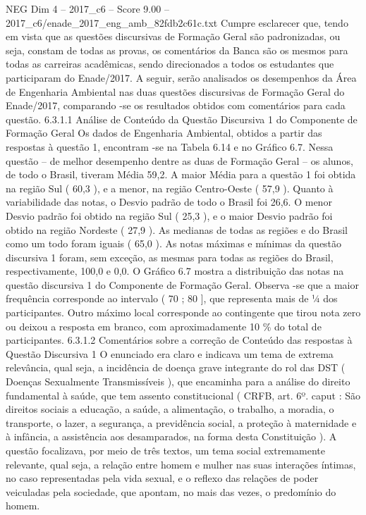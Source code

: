 \begin{textsample}{NEG Dim 4 – 2017\_c6 – Score 9.00 – 2017\_c6/enade\_2017\_eng\_amb\_82fdb2c61c.txt}
Cumpre esclarecer que, tendo em vista que as questões discursivas de Formação Geral são padronizadas, ou seja, constam de todas as provas, os comentários da Banca são os mesmos para todas as carreiras acadêmicas, sendo direcionados a todos os estudantes que participaram do Enade/2017.
A seguir, serão analisados os desempenhos da Área de Engenharia Ambiental nas duas questões discursivas de Formação Geral do Enade/2017, comparando -se os resultados obtidos com comentários para cada questão. 6.3.1.1 Análise de Conteúdo da Questão Discursiva 1 do Componente de Formação Geral Os dados de Engenharia Ambiental, obtidos a partir das respostas à questão 1, encontram -se na Tabela 6.14 e no Gráfico 6.7.
Nessa questão – de melhor desempenho dentre as duas de Formação Geral – os alunos, de todo o Brasil, tiveram Média 59,2.
A maior Média para a questão 1 foi obtida na região Sul ( 60,3 ), e a menor, na região Centro-Oeste ( 57,9 ).
Quanto à variabilidade das notas, o Desvio padrão de todo o Brasil foi 26,6.
O menor Desvio padrão foi obtido na região Sul ( 25,3 ), e o maior Desvio padrão foi obtido na região Nordeste ( 27,9 ).
As medianas de todas as regiões e do Brasil como um todo foram iguais ( 65,0 ).
As notas máximas e mínimas da questão discursiva 1 foram, sem exceção, as mesmas para todas as regiões do Brasil, respectivamente, 100,0 e 0,0.
O Gráfico 6.7 mostra a distribuição das notas na questão discursiva 1 do Componente de Formação Geral.
Observa -se que a maior frequência corresponde ao intervalo ( 70 ; 80 ], que representa mais de ¼ dos participantes.
Outro máximo local corresponde ao contingente que tirou nota zero ou deixou a resposta em branco, com aproximadamente 10 \% do total de participantes. 6.3.1.2 Comentários sobre a correção de Conteúdo das respostas à Questão Discursiva 1 O enunciado era claro e indicava um tema de extrema relevância, qual seja, a incidência de doença grave integrante do rol das DST ( Doenças Sexualmente Transmissíveis ), que encaminha para a análise do direito fundamental à saúde, que tem assento constitucional ( CRFB, art. 6º. caput : São direitos sociais a educação, a saúde, a alimentação, o trabalho, a moradia, o transporte, o lazer, a segurança, a previdência social, a proteção à maternidade e à infância, a assistência aos desamparados, na forma desta Constituição ).
A questão focalizava, por meio de três textos, um tema social extremamente relevante, qual seja, a relação entre homem e mulher nas suas interações íntimas, no caso representadas pela vida sexual, e o reflexo das relações de poder veiculadas pela sociedade, que apontam, no mais das vezes, o predomínio do homem.

\end{textsample}
